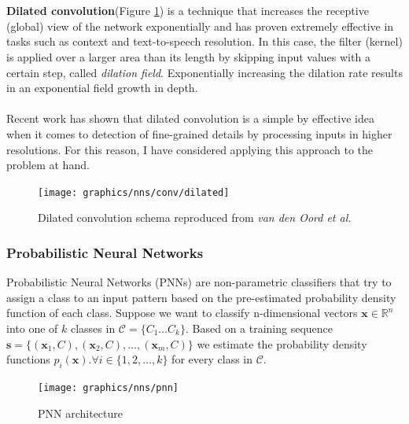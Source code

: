 	\\ \\
	\textbf{Dilated convolution}(Figure \ref{Fig: prep/ml/cnn/dilated}) is a technique that increases the receptive (global) view of the network exponentially and has proven extremely effective in tasks such as context and text-to-speech resolution. In this case, the filter (kernel) is applied over a larger area than its length by skipping input values with a certain step, called \textit{dilation field}. Exponentially increasing the dilation rate results in an exponential field growth in depth\cite{DBLP:journals/corr/YuK15}.  
	\\ \\
	Recent work has shown that dilated convolution is a simple by effective idea when it comes to detection of fine-grained details by processing inputs in higher resolutions. For this reason, I have considered applying this approach to the problem at hand.
	
	\begin{figure}[H]
		\centering
		\texttt{[image: graphics/nns/conv/dilated]}
		\caption[Dilated convolution]{Dilated convolution schema reproduced from \textit{van den Oord et al.} \citep{DBLP:journals/corr/OordDZSVGKSK16}}
		\label{Fig: prep/ml/cnn/dilated}
	\end{figure}
	
	\subsubsection{Probabilistic Neural Networks}
 	Probabilistic Neural Networks (PNNs) are non-parametric classifiers that try to assign a class to an input pattern based on the pre-estimated probability density function of each class. Suppose we want to classify n-dimensional vectors $\mathbf{x} \in \mathbb{R}^n$ into one of $k$ classes in $\mathcal{C}=\{C_1\dots C_k\}$. Based on a training sequence $\mathbf{s} = \{ (\mathbf{x}_1, C), (\mathbf{x}_2, C), \dots ,(\mathbf{x}_m, C)\}$ we estimate the probability density functions $p_i(\mathbf{x}). \forall i \in \{1,2,\dots,k \}$ for every class in $\mathcal{C}$. 

  	\begin{figure}[H]
 		\centering
 		\texttt{[image: graphics/nns/pnn]}
 		\caption{PNN architecture}
 		\label{Fig 2.8}
 	\end{figure}
	 
